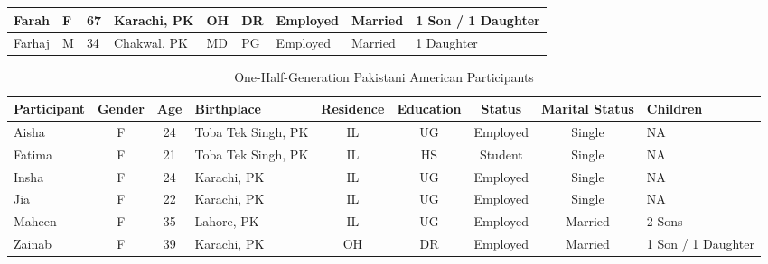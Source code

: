 \begin{landscape}
\begin{table}[p]
\begin{tabular}{|l|l|l|l|l|l|l|l|l|}
Farah                & F               & 67           & Karachi, PK         & OH                 & DR                 & Employed        & Married                   & 1 Son / 1 Daughter  \\ \hline
Farhaj               & M               & 34           & Chakwal, PK         & MD                 & PG                 & Employed        & Married                   & 1 Daughter          \\ \hline
\end{tabular}
\end{table}
\end{landscape}

\begin{landscape}
\thispagestyle{lscape} %
\begin{table}[p]   %
\centering
\caption{One-Half-Generation Pakistani American Participants}
\label{tab:one-half-generation}
\begin{tabular}{|l|c|c|l|c|c|c|c|l|}
\hline
\textbf{Participant} & \textbf{Gender} & \textbf{Age} & \textbf{Birthplace} & \textbf{Residence} & \textbf{Education} & \textbf{Status} & \textbf{Marital Status} & \textbf{Children} \\
\hline
Aisha & F & 24 & Toba Tek Singh, PK & IL & UG & Employed & Single & NA \\
\hline
Fatima & F & 21 & Toba Tek Singh, PK & IL & HS & Student & Single & NA \\
\hline
Insha & F & 24 & Karachi, PK & IL & UG & Employed & Single & NA \\
\hline
Jia & F & 22 & Karachi, PK & IL & UG & Employed & Single & NA \\
\hline
Maheen & F & 35 & Lahore, PK & IL & UG & Employed & Married & 2 Sons \\
\hline
Zainab & F & 39 & Karachi, PK & OH & DR & Employed & Married & 1 Son / 1 Daughter \\
\hline
\end{tabular}
\end{table}
\end{landscape}


